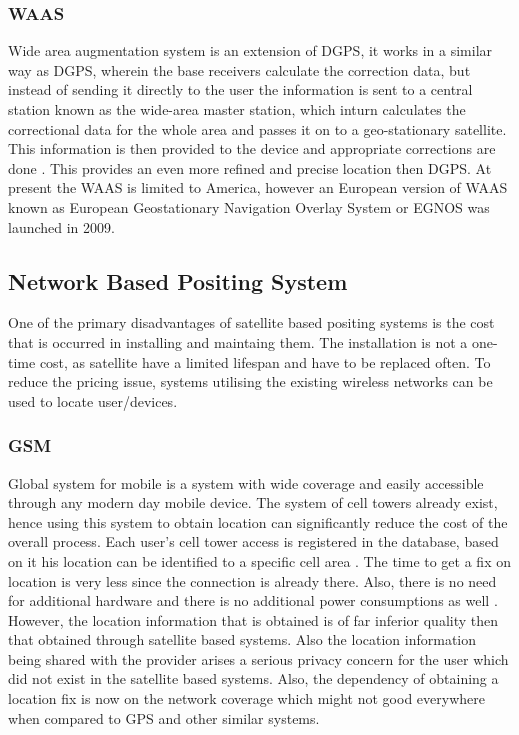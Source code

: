 \documentclass[12pt]{report}
\begin{document}
\subsubsection{WAAS}

Wide area augmentation system is an extension of DGPS, it works in a similar way as DGPS, wherein the base receivers calculate the correction data, but instead of sending it directly to the user the information is sent to a central station known as the wide-area master station, which inturn calculates the correctional data for the whole area and passes it on to a geo-stationary satellite. This information is then provided to the device and appropriate corrections are done \cite{corrections2004comparing}. This provides an even more refined and precise location then DGPS. At present the WAAS is limited to America, however an European version of WAAS known as European Geostationary Navigation Overlay System or EGNOS was launched in 2009.


\subsection{Network Based Positing System}


One of the primary disadvantages of satellite based positing systems is the cost that is occurred in installing and maintaing them. The installation is not a one-time cost, as satellite have a limited lifespan and have to be replaced often. To reduce the pricing issue, systems utilising the existing wireless networks can be used to locate user/devices.

\subsubsection{GSM}
Global system for mobile is a system with wide coverage and easily accessible through any modern day mobile device. The system of cell towers already exist, hence using this system to obtain location can significantly reduce the cost of the overall process. Each user's cell tower access is registered in the database, based on it his location can be identified to a specific cell area \cite{schiller2004location}. The time to get a fix on location is very less since the connection is already there. Also, there is no need for additional hardware and there is no additional power consumptions as well \cite{djuknic2001geolocation}. However, the location information that is obtained is of far inferior quality then that obtained through satellite based systems. Also the location information being shared with the provider arises a serious privacy concern for the user which did not exist in the satellite based systems. Also, the dependency of obtaining a location fix is now on the network coverage which might not good everywhere when compared to GPS and other similar systems.
\end{document}
